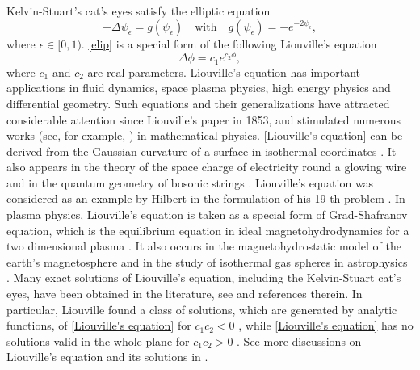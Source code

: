 \documentclass[1 [leqno, 11pt]{amsart}
\numberwithin{equation}{section}
\let\ep=\epsilon
\begin{document}
\begin{CJK*}{GBK}{song}

  Kelvin-Stuart's cat's eyes  satisfy the  elliptic equation
 \begin{equation}\label{elip}
  - \Delta \psi_\epsilon = g(\psi_\epsilon)\quad \text{with}\quad g(\psi_\epsilon) =- e^{-2\psi_\epsilon},
 \end{equation}
 where $\ep\in[0,1)$. \eqref{elip} is a special form of the following Liouville's equation
\begin{equation}\label{Liouville's equation}
   \Delta \phi = c_1 e^{c_2\phi},
 \end{equation}
where $c_1$ and $c_2$ are real parameters. Liouville's equation has important applications in fluid dynamics, space plasma physics, high energy physics and differential geometry.  Such equations and their generalizations have attracted considerable   attention   since Liouville's paper \cite{Liouville1853} in 1853, and    stimulated numerous works (see, for example, \cite{Poincare18998,Picard1,Picard3,lichtenstein1913,lichtenstein1915,Walker1915,Bieberrach1916,Brodetsky1924}) in mathematical physics. \eqref{Liouville's equation} can be  derived  from  the Gaussian curvature of a surface in isothermal coordinates \cite{Lutzen2012}. It also appears in the theory of the space charge of electricity round a glowing wire \cite{Richardson1921} and in the  quantum geometry of bosonic strings \cite{Polyakov81}. Liouville's equation was considered as an example by  Hilbert  in the formulation of his 19-th problem \cite{Hilbert1900}.  In plasma physics, Liouville's equation is taken as  a special form of Grad-Shafranov equation, which is
the equilibrium equation in ideal magnetohydrodynamics  for a two dimensional plasma \cite{Schindler2006}.
It also occurs in the magnetohydrostatic model of the
earth's magnetosphere \cite{Schindler2006} and in the study of isothermal gas
spheres in astrophysics \cite{Emden1907}.
Many exact solutions of Liouville's equation, including the Kelvin-Stuart cat's eyes, have been obtained in the literature, see \cite{Crowdy97} and references therein. In particular,
Liouville found a class of solutions, which are generated by analytic functions,  of
\eqref{Liouville's equation} for $c_1c_2<0$ \cite{Liouville1853}, while
\eqref{Liouville's equation} has no solutions valid in the whole plane for $c_1c_2>0$ \cite{Keller1957,Wittich44}.
See more discussions on Liouville's equation and its solutions in \cite{Bogatov-Kichenassamy22,Bateman32}.
\fi


\end{CJK*}
\end{document}
